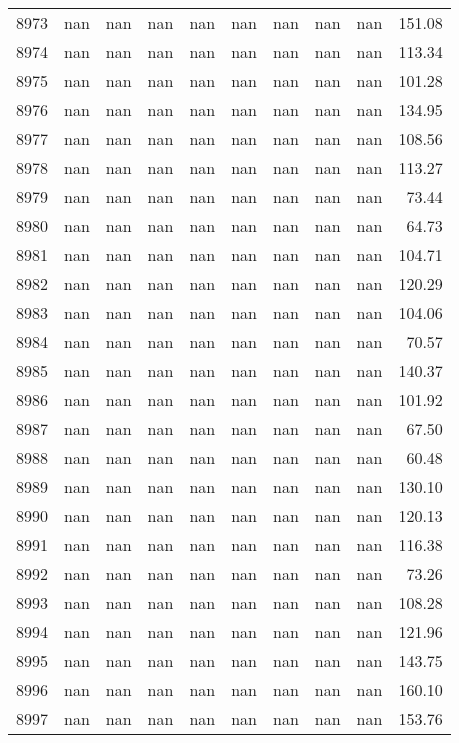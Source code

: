 \begin{tabular}{lrrrrrrrrr}
8973 & nan & nan & nan & nan & nan & nan & nan & nan & 151.08 \\
8974 & nan & nan & nan & nan & nan & nan & nan & nan & 113.34 \\
8975 & nan & nan & nan & nan & nan & nan & nan & nan & 101.28 \\
8976 & nan & nan & nan & nan & nan & nan & nan & nan & 134.95 \\
8977 & nan & nan & nan & nan & nan & nan & nan & nan & 108.56 \\
8978 & nan & nan & nan & nan & nan & nan & nan & nan & 113.27 \\
8979 & nan & nan & nan & nan & nan & nan & nan & nan & 73.44 \\
8980 & nan & nan & nan & nan & nan & nan & nan & nan & 64.73 \\
8981 & nan & nan & nan & nan & nan & nan & nan & nan & 104.71 \\
8982 & nan & nan & nan & nan & nan & nan & nan & nan & 120.29 \\
8983 & nan & nan & nan & nan & nan & nan & nan & nan & 104.06 \\
8984 & nan & nan & nan & nan & nan & nan & nan & nan & 70.57 \\
8985 & nan & nan & nan & nan & nan & nan & nan & nan & 140.37 \\
8986 & nan & nan & nan & nan & nan & nan & nan & nan & 101.92 \\
8987 & nan & nan & nan & nan & nan & nan & nan & nan & 67.50 \\
8988 & nan & nan & nan & nan & nan & nan & nan & nan & 60.48 \\
8989 & nan & nan & nan & nan & nan & nan & nan & nan & 130.10 \\
8990 & nan & nan & nan & nan & nan & nan & nan & nan & 120.13 \\
8991 & nan & nan & nan & nan & nan & nan & nan & nan & 116.38 \\
8992 & nan & nan & nan & nan & nan & nan & nan & nan & 73.26 \\
8993 & nan & nan & nan & nan & nan & nan & nan & nan & 108.28 \\
8994 & nan & nan & nan & nan & nan & nan & nan & nan & 121.96 \\
8995 & nan & nan & nan & nan & nan & nan & nan & nan & 143.75 \\
8996 & nan & nan & nan & nan & nan & nan & nan & nan & 160.10 \\
8997 & nan & nan & nan & nan & nan & nan & nan & nan & 153.76 \\

\end{tabular}
